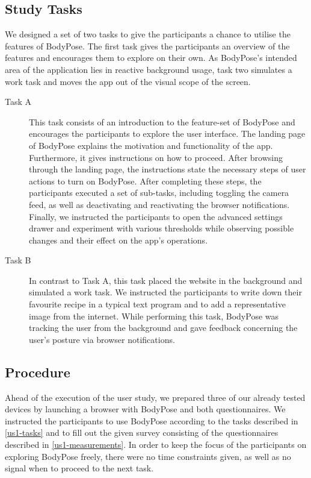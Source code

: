 \subsection{Study Tasks}
\label{us1-tasks}
We designed a set of two tasks to give the participants a chance to utilise the features of BodyPose. The first task gives the participants an overview of the features and encourages them to explore on their own. As BodyPose's intended area of the application lies in reactive background usage, task two simulates a work task and moves the app out of the visual scope of the screen.

\begin{description}
\item[Task A] This task consists of an introduction to the feature-set of BodyPose and encourages the participants to explore the user interface. The landing page of BodyPose explains the motivation and functionality of the app. Furthermore, it gives instructions on how to proceed. After browsing through the landing page, the instructions state the necessary steps of user actions to turn on BodyPose. After completing these steps, the participants executed a set of sub-tasks, including toggling the camera feed, as well as deactivating and reactivating the browser notifications. Finally, we instructed the participants to open the advanced settings drawer and experiment with various thresholds while observing possible changes and their effect on the app's operations.\\

\item[Task B]  In contrast to Task A, this task placed the website in the background and simulated a work task. We instructed the participants to write down their favourite recipe in a typical text program and to add a representative image from the internet. While performing this task, BodyPose was tracking the user from the background and gave feedback concerning the user's posture via browser notifications.
\end{description}

\subsection{Procedure}
\label{us1-procedure}
Ahead of the execution of the user study, we prepared three of our already tested devices by launching a browser with BodyPose and both questionnaires.
We instructed the participants to use BodyPose according to the tasks described in \autoref{us1-tasks} and to fill out the given survey consisting of the questionnaires described in \autoref{us1-measurements}. In order to keep the focus of the participants on exploring BodyPose freely, there were no time constraints given, as well as no signal when to proceed to the next task.
  

